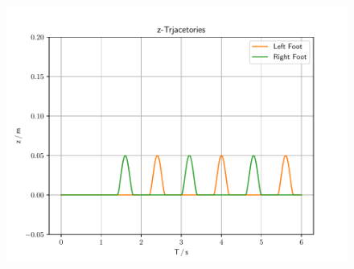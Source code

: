 \begin{figure}[h]
	[.3\linewidth]{\includegraphics[scale=.3]{chapters/05_experiments/01_user_controlled_walking/01_benchmarking/interpolated_z_trajectories.pdf}}
	\caption{}
	\label{fig::511_benchmarking_inter}
\end{figure} 
